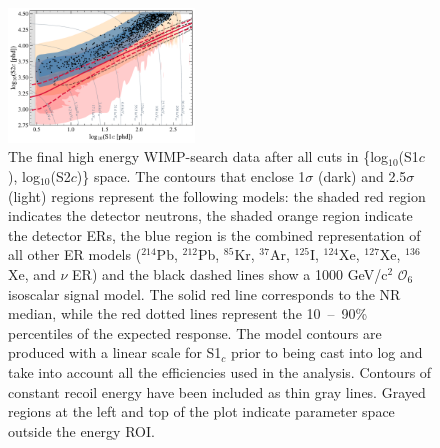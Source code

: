\documentclass[reprint, showpacs,
preprintnumbers,
amsmath,amssymb,
aps, floatfix,
superscriptaddress,
prd, nofootinbib]{revtex4-1}
\begin{document}
\begin{figure}[ht]
    \centering
    \includegraphics[trim={8 5 5 5},clip, width=0.44\textwidth]{logs1logs2_SR1_EFT_06s_1000GeV_0keV_paperPlot}
\caption{The final high energy WIMP-search data after all cuts in \{log$_{10}$(S1$c$), log$_{10}$(S2$c$)\} space. 
    The contours that enclose 1$\sigma$ (dark) and 2.5$\sigma$ (light) regions represent the following models: 
    the shaded red region indicates the detector neutrons, the shaded orange region indicate the detector ERs, the blue region is the combined representation of all other ER models (${}^{214}$Pb, ${}^{212}$Pb, ${}^{85}$Kr, ${}^{37}$Ar,  ${}^{125}$I, ${}^{124}$Xe, ${}^{127}$Xe, ${}^{136}$Xe, and $\nu$ ER) and the black dashed lines show a 1000 GeV/c$^2$ $\mathcal{O}_6$ isoscalar signal model. 
    The solid red line corresponds to the NR median, while the red dotted lines represent the 10~--~90\% percentiles of the expected response.
    The model contours are produced with a linear scale for S1$_c$ prior to being cast into log and take into account all the efficiencies used in the analysis. 
    Contours of constant recoil energy have been included as thin gray lines. Grayed regions at the left and top of the plot indicate parameter space outside the energy ROI.
}

    \label{fig:data-ROI}
\end{figure}
\end{document}
